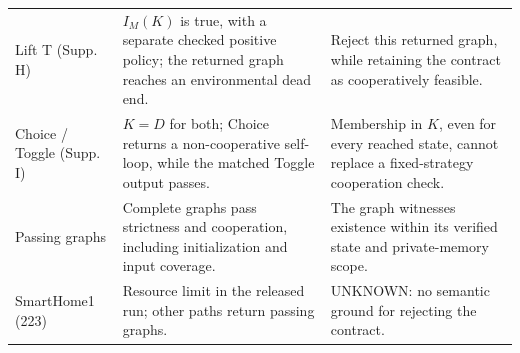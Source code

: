 \begin{longtable}{@{}L{22mm}L{57mm}L{72mm}@{}}
Lift T (Supp. H) & $I_M(K)$ is true, with a separate checked positive policy; the returned graph reaches an environmental dead end. & Reject this returned graph, while retaining the contract as cooperatively feasible.\\[2pt]
Choice / Toggle (Supp. I) & $K=D$ for both; Choice returns a non-cooperative self-loop, while the matched Toggle output passes. & Membership in $K$, even for every reached state, cannot replace a fixed-strategy cooperation check.\\[2pt]
Passing graphs & Complete graphs pass strictness and cooperation, including initialization and input coverage. & The graph witnesses existence within its verified state and private-memory scope.\\[2pt]
SmartHome1 (223) & Resource limit in the released run; other paths return passing graphs. & UNKNOWN: no semantic ground for rejecting the contract.\\
\bottomrule
\end{longtable}
\endgroup
